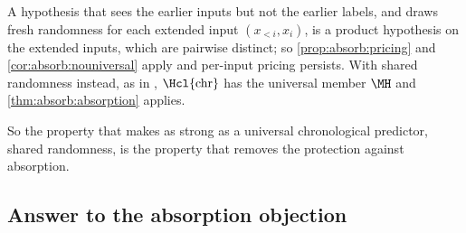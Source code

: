 \begin{proposition}\label{prop:absorb:inputs}
A hypothesis that sees the earlier inputs but not the earlier labels, and draws fresh randomness for each extended input $(x_{<i},x_i)$, is a product hypothesis on the extended inputs, which are pairwise distinct; so \cref{prop:absorb:pricing} and \cref{cor:absorb:nouniversal} apply and per-input pricing persists. With shared randomness instead, as in \SFIhist{}, $\Hcl{\mathrm{chr}}$ has the universal member $\MH$ and \cref{thm:absorb:absorption} applies.
\end{proposition}

So the property that makes \SFIhist{} as strong as a universal chronological predictor, shared randomness, is the property that removes the protection against absorption.

\subsection{Answer to the absorption objection}\label{sec:absorb:answer}

